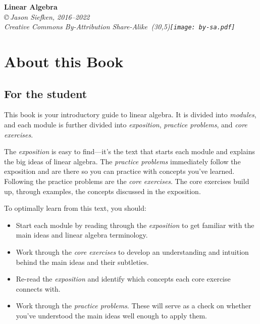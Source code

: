 \begin{center}
	{\color{myorange}\huge\bfseries\sffamily Linear Algebra}\\

\vspace{.2in}
{
\it \copyright\,Jason Siefken, 2016--2022 \\
Creative Commons By-Attribution Share-Alike\, \makebox(30,5){\texttt{[image: by-sa.pdf]}}
}
\end{center}

\section*{About this Book}

\subsection*{For the student}

This book is your introductory guide to linear algebra. It is divided into
\emph{modules}, and each module is further divided into \emph{exposition},
\emph{practice problems}, and \emph{core exercises}.

The \emph{exposition} is easy to find---it's the text that starts each
module and explains the big ideas of linear algebra.  The \emph{practice
problems} immediately follow the exposition and are there so you can
practice with concepts you've learned.  Following the practice problems
are the \emph{core exercises}. The core exercises build up, through
examples, the concepts discussed in the exposition.

To optimally learn from this text, you should:
\begin{itemize}
	\item Start each module by reading through the \emph{exposition} to get familiar with the main ideas and 
		linear algebra terminology.

	\item Work through the \emph{core exercises} to develop an understanding and intuition behind the main ideas
		and their subtleties.

	\item Re-read the \emph{exposition} and identify which concepts each core exercise connects with.

	\item Work through the \emph{practice problems}. These will serve as a check on whether you've understood
		the main ideas well enough to apply them.
\end{itemize}

